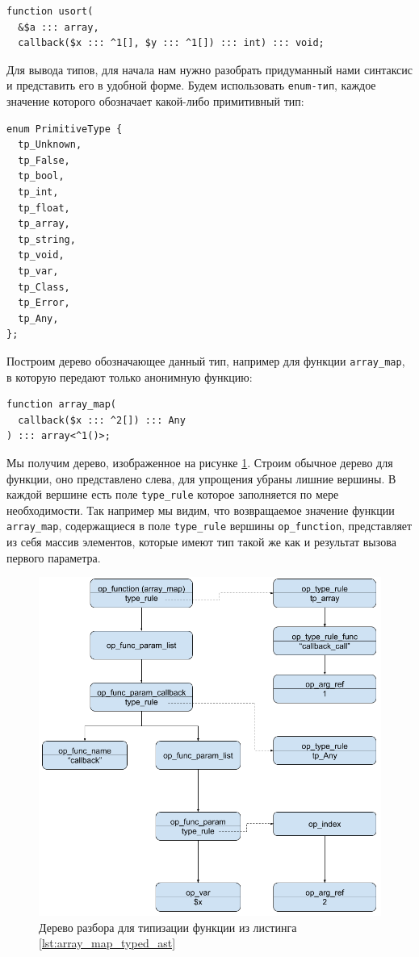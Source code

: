 \begin{lstlisting}[caption={Пример типизации функции usort},label={lst:typed_usort}]
function usort(
  &$a ::: array,
  callback($x ::: ^1[], $y ::: ^1[]) ::: int) ::: void;

\end{lstlisting}

Для вывода типов, для начала нам нужно разобрать придуманный нами синтаксис и представить его в удобной форме.
Будем использовать \verb|enum-тип|, каждое значение которого обозначает какой-либо примитивный тип:
\begin{lstlisting}
enum PrimitiveType {
  tp_Unknown,
  tp_False,
  tp_bool,
  tp_int,
  tp_float,
  tp_array,
  tp_string,
  tp_void,
  tp_var,
  tp_Class,
  tp_Error,
  tp_Any,
};
\end{lstlisting}

Построим дерево обозначающее данный тип, например для функции \verb|array_map|, в которую передают только анонимную функцию:
\begin{lstlisting}[label={lst:array_map_typed_ast}]
function array_map(
  callback($x ::: ^2[]) ::: Any
) ::: array<^1()>;
\end{lstlisting}
Мы получим дерево, изображенное на рисунке \ref{fig:ast_for_callback}.
Строим обычное дерево для функции, оно представлено слева, для упрощения убраны лишние вершины.
В каждой вершине есть поле \verb|type_rule| которое заполняется по мере необходимости.
Так например мы видим, что возвращаемое значение функции \verb|array_map|, содержащиеся в поле \verb|type_rule| вершины \verb|op_function|, представляет из себя массив элементов, которые имеют тип такой же как и результат вызова первого параметра.

\begin{figure}[H]
    \caption{Дерево разбора для типизации функции из листинга \ref{lst:array_map_typed_ast}}
    \label{fig:ast_for_callback}
    \centering
    \includegraphics[width=\linewidth]{images/ast_for_callback}
\end{figure}

